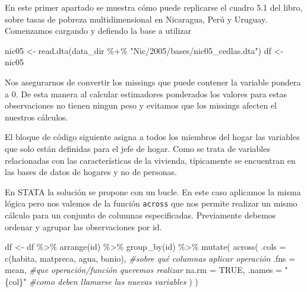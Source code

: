 \documentclass[
]{book}
\newenvironment{Shaded}{\begin{snugshade}}{\end{snugshade}}
\newcommand{\AttributeTok}[1]{\textcolor[rgb]{0.77,0.63,0.00}{#1}}
\newcommand{\CommentTok}[1]{\textcolor[rgb]{0.56,0.35,0.01}{\textit{#1}}}
\newcommand{\ConstantTok}[1]{\textcolor[rgb]{0.00,0.00,0.00}{#1}}
\newcommand{\DecValTok}[1]{\textcolor[rgb]{0.00,0.00,0.81}{#1}}
\newcommand{\FunctionTok}[1]{\textcolor[rgb]{0.00,0.00,0.00}{#1}}
\newcommand{\NormalTok}[1]{#1}
\newcommand{\OtherTok}[1]{\textcolor[rgb]{0.56,0.35,0.01}{#1}}
\newcommand{\SpecialCharTok}[1]{\textcolor[rgb]{0.00,0.00,0.00}{#1}}
\newcommand{\StringTok}[1]{\textcolor[rgb]{0.31,0.60,0.02}{#1}}
\begin{document}
En este primer apartado se muestra cómo puede replicarse el cuadro 5.1 del libro, sobre tasas de pobreza multidimensional en Nicaragua, Perú y Uruguay. Comenzamos cargando y defiendo la base a utilizar

\begin{Shaded}
\begin{Highlighting}[]
\NormalTok{nic05 }\OtherTok{\textless{}{-}} \FunctionTok{read.dta}\NormalTok{(data\_dir }\SpecialCharTok{\%+\%} \StringTok{"Nic/2005/bases/nic05\_cedlas.dta"}\NormalTok{)      }
\NormalTok{df }\OtherTok{\textless{}{-}}\NormalTok{ nic05}
\end{Highlighting}
\end{Shaded}

Nos asegurarnos de convertir los missings que puede contener la variable pondera a 0. De esta manera al calcular estimadores ponderados los valores para estas observaciones no tienen ningun peso y evitamos que los missings afecten el nuestros cálculos.

\begin{Shaded}
\end{Shaded}

El bloque de código siguiente asigna a todos los miembros del hogar las variables que solo están definidas para el jefe de hogar. Como se trata de variables relacionadas con las características de la vivienda, típicamente se encuentran en las bases de datos de hogares y no de personas.

En STATA la solución se propone con un bucle. En este caso aplicamos la misma lógica pero nos valemos de la función \texttt{across} que nos permite realizar un mismo cálculo para un conjunto de columnas especificadas. Previamente debemos ordenar y agrupar las observaciones por id.

\begin{Shaded}
\begin{Highlighting}[]
\NormalTok{df }\OtherTok{\textless{}{-}}\NormalTok{ df }\SpecialCharTok{\%\textgreater{}\%} \FunctionTok{arrange}\NormalTok{(id) }\SpecialCharTok{\%\textgreater{}\%} \FunctionTok{group\_by}\NormalTok{(id) }\SpecialCharTok{\%\textgreater{}\%}
      \FunctionTok{mutate}\NormalTok{(}
        \FunctionTok{across}\NormalTok{(}
         \AttributeTok{.cols  =} \FunctionTok{c}\NormalTok{(habita, matpreca, agua, banio), }\CommentTok{\#sobre qué columnas aplicar operación}
         \AttributeTok{.fns   =}\NormalTok{ mean,   }\CommentTok{\#que operación/función queremos realizar}
          \AttributeTok{na.rm =} \ConstantTok{TRUE}\NormalTok{,                                 }
         \AttributeTok{.names =} \StringTok{"\{col\}"} \CommentTok{\#como deben llamarse las nuevas variables}
\NormalTok{                )}
\NormalTok{                  )}
\end{Highlighting}
\end{Shaded}
\end{document}
